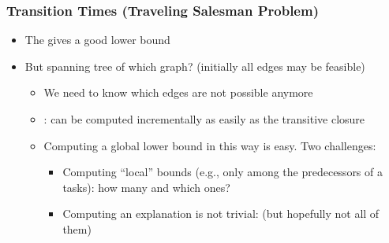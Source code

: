 \begin{frame}
\frametitle{Transition Times (Traveling Salesman Problem)}

\pause
\begin{itemize}
	\item The  gives a good lower bound

	\vfill\pause
	\item But spanning tree of which graph? (initially all edges may be feasible)

	\vfill\pause
	\begin{itemize}
		\item We need to know which edges are not possible anymore

		\vfill\pause
		\item {}: can be computed incrementally as easily as the transitive closure

		\vfill\pause
		\item Computing a global lower bound in this way is easy. \pause Two challenges:

		\vfill
		\begin{itemize}
			\item Computing ``local'' bounds (e.g., only among the predecessors of a tasks): how many and which ones?

			\vfill
			\item Computing an explanation is not trivial:  (but hopefully not all of them)
		\end{itemize}
	\end{itemize}
\end{itemize}

\end{frame}


